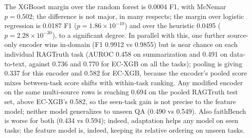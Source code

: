 \documentclass[a4paper,fleqn]{cas-sc}
\begin{document}
The XGBoost margin over the random forest is 0.0004 F1, with McNemar $p=0.502$; the difference is not major, in many respects; the margin over logistic regression is 0.0187 F1 ($p=1.86\times10^{-10}$) and over the heuristic 0.0495 ($p=2.28\times10^{-30}$), to a significant degree. In parallel with this, one further source-only encoder wins in-domain (F1 0.9912 vs 0.9855) but is near chance on each individual RAGTruth task (AUROC 0.458 on summarization and 0.491 on data-to-text, against 0.736 and 0.770 for EC-XGB on all the tasks); pooling is giving 0.337 for this encoder and 0.582 for EC-XGB, because the encoder's pooled score mixes between-task score shifts with within-task ranking. Any modified encoder on the same multi-source rows is reaching 0.694 on the pooled RAGTruth test set, above EC-XGB's 0.582, so the seen-task gain is not precise to the feature model; neither model generalizes to unseen QA (0.490 vs 0.549). Also faithBench is worse for both (0.434 vs 0.594); indeed, adaptation helps any model on seen tasks; the feature model is, indeed, keeping its relative ordering on unseen tasks.
\end{document}
